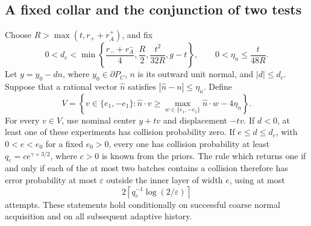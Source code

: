 \subsection{A fixed collar and the conjunction of two tests}
\begin{lemma}
\label{lem:two-field-collar-details}
Choose $R>\max(t,r_++r_A^+)$, and fix
\[
 0<d_c<\min\left\{\frac{r_-+r_A^-}{4},\frac R2,
                 \frac{t^2}{32R},g-t\right\},
 \qquad 0<\eta_n\le\frac{t}{48R}.
\]
Let $y=y_0-dn$, where $y_0\in\partial P_C$, $n$ is its outward
unit normal, and $|d|\le d_c$.  Suppose that a rational vector
$\widehat n$ satisfies $|\widehat n-n|\le\eta_n$.  Define
\[
 V=\left\{v\in\{e_1,-e_1\}:\widehat n\cdot v
     \ge\max_{w\in\{e_1,-e_1\}}\widehat n\cdot w-4\eta_n\right\}.
\]
For every $v\in V$, use nominal center $y+tv$ and displacement
$-tv$.  If $d<0$, at least one of these experiments has collision
probability zero.  If $e\le d\le d_c$, with $0<e<e_0$ for a fixed
$e_0>0$, every one has collision probability at least
$q_e=c e^{\gamma+3/2}$, where $c>0$ is known from the priors.
The rule which returns one if and only if each of the at most two
batches contains a collision therefore has error probability at most
$\varepsilon$ outside the inner layer of width $e$, using at most
\[
 2\left\lceil q_e^{-1}\log(2/\varepsilon)\right\rceil
\]
attempts.  These statements hold conditionally on successful coarse
normal acquisition and on all subsequent adaptive history.
\end{lemma}
